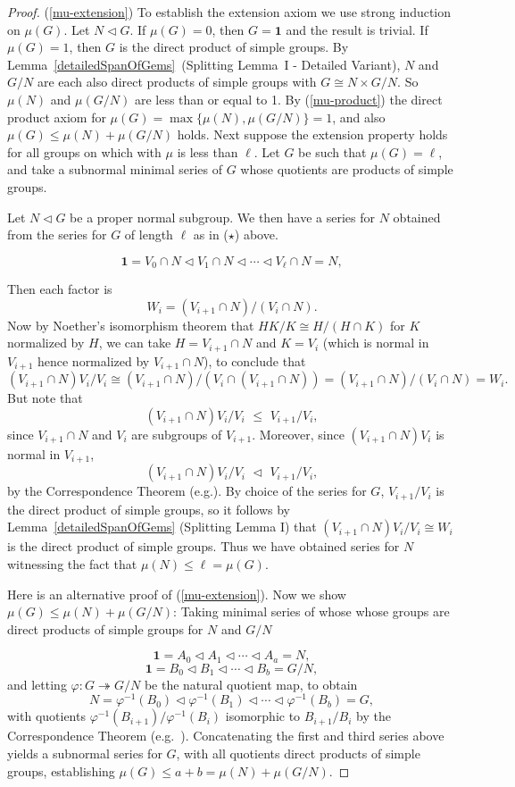 \documentclass[a4paper,11pt]{amsart}
\theoremstyle{definition}
\newcommand{\sur}{\twoheadrightarrow}
\newcommand{\1}{{\mathbf 1}}
\begin{document}
\begin{proof}
(\ref{mu-extension}) To establish the extension axiom we use strong induction on $\mu(G)$. Let $N\lhd G$. If $\mu(G)=0$, then $G=\1$ and the result is trivial. If  $\mu(G)=1$, then $G$ is the direct product of simple groups. By Lemma~\ref{detailedSpanOfGems}~(Splitting Lemma~I - Detailed Variant), 
$N$ and $G/N$ are each also direct products of simple groups with $G\cong N \times G/N$. So $\mu(N)$ and $\mu(G/N)$ are less than or equal to 1. By (\ref{mu-product}) the direct product axiom for $\mu(G)=\max\{\mu(N),\mu(G/N)\}=1$, and also $\mu(G) \leq \mu(N)+\mu(G/N)$ holds.  
Next suppose the extension property holds for all groups on which  with $\mu$ is less than $\ell$.   Let $G$ be such that $\mu(G)=\ell$,   and take a subnormal minimal series of $G$ whose quotients are products of simple groups. 

Let $N \lhd G$ be a proper normal subgroup.   We then have a series for $N$ obtained from the series for $G$ of length $\ell$ 
as in ($\star$) above.

$$\1 =V_0 \cap N \lhd V_1 \cap N \lhd \cdots \lhd V_{\ell}\cap N =N,$$

Then
each factor is 
$$W_{i}= (V_{i+1}\cap N) / (V_i \cap N).$$ Now by  Noether's 
isomorphism theorem  that $HK/K\cong H/(H\cap K)$ for $K$ normalized by $H$, we can take $H=V_{i+1}\cap N$ and $K=V_i$ (which is normal in $V_{i+1}$ hence normalized by $V_{i+1}\cap N$), to conclude that 
$$(V_{i+1}\cap N)V_i/V_i \cong (V_{i+1}\cap N)/(V_i\cap (V_{i+1}\cap N)) = (V_{i+1}\cap N)/(V_i \cap N)=W_{i}.$$
But note that 
$$(V_{i+1}\cap N)V_i/V_i \,\, \leq \,\, V_{i+1}/V_i,$$
since 
$V_{i+1}\cap N$ and $V_i$ are subgroups of $V_{i+1}$. 
Moreover,  since $(V_{i+1}\cap N)V_i$  is normal in $V_{i+1}$, 
$$(V_{i+1}\cap N)V_i/V_i \,\, \lhd \,\,  V_{i+1}/V_i,$$ by
the Correspondence Theorem (e.g.\cite[Theorem~2.28]{Rotman}).
By choice of the series for $G$,  $V_{i+1}/V_i$ is the direct product of simple groups, so it follows by Lemma~\ref{detailedSpanOfGems} (Splitting Lemma I)
that $(V_{i+1}\cap N)V_i/V_i\cong W_i$ is the direct product of simple groups.   
Thus we have obtained series for $N$ witnessing the fact that $\mu(N) \leq \ell =\mu(G)$.

Here is an alternative proof of
(\ref{mu-extension}). Now we show $\mu(G) \leq \mu(N) + \mu(G/N)$:
Taking minimal series of whose whose groups are direct products of simple groups for $N$ and $G/N$

$$\1 =A_0  \lhd A_1   \lhd \cdots \lhd A_{a}  = N,$$
$$\1 =B_0  \lhd B_1  \lhd \cdots \lhd B_{b} =G/N,$$
and letting $\varphi:G\sur G/N$ be the natural quotient map, to obtain
$$N = \varphi^{-1}(B_0) \lhd \varphi^{-1}(B_1) \lhd \cdots \lhd \varphi^{-1}(B_b) = G,$$
with quotients $\varphi^{-1}(B_{i+1})/\varphi^{-1}(B_i)$ isomorphic to  $B_{i+1}/B_i$ by the Correspondence Theorem (e.g.\ \cite[Theorem~2.28]{Rotman}).  Concatenating the first and third series above yields a subnormal series for $G$,  with all quotients direct products of simple groups, establishing $\mu(G) \leq  a + b = \mu(N)+\mu(G/N)$. \end{proof}
\end{document}
